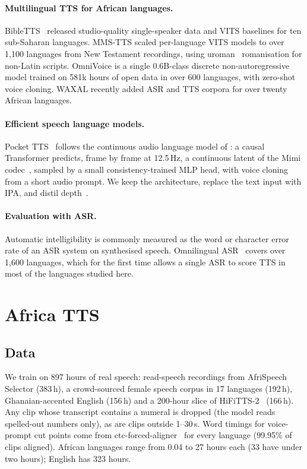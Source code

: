 \documentclass[10pt,twocolumn]{article}
\newcommand{\att}{Africa TTS}
\begin{document}
\paragraph{Multilingual TTS for African languages.} BibleTTS~\cite{meyer2022bibletts} released
studio-quality single-speaker data and VITS baselines for ten sub-Saharan languages. MMS-TTS
\cite{pratap2023mms} scaled per-language VITS models to over 1{,}100 languages from New Testament
recordings, using uroman~\cite{hermjakob2018uroman} romanisation for non-Latin scripts. OmniVoice
\cite{zhu2026omnivoice} is a single 0.6B-class discrete non-autoregressive model trained on
581k hours of open data in over 600 languages, with zero-shot voice cloning. WAXAL
\cite{diack2026waxal} recently added ASR and TTS corpora for over twenty African languages.

\paragraph{Efficient speech language models.} Pocket TTS~\cite{pockettts} follows the
continuous audio language model of \citet{rouard2025calm}: a causal Transformer predicts, frame
by frame at 12.5\,Hz, a continuous latent of the Mimi codec~\cite{defossez2024moshi}, sampled
by a small consistency-trained MLP head, with voice cloning from a short audio prompt. We keep
the architecture, replace the text input with IPA, and distil depth~\cite{hinton2015distilling}.

\paragraph{Evaluation with ASR.} Automatic intelligibility is commonly measured as the word or
character error rate of an ASR system on synthesised speech. Omnilingual ASR~\cite{omniasr2025}
covers over 1{,}600 languages, which for the first time allows a single ASR to score TTS in
most of the languages studied here.

\section{\att{}}

\subsection{Data}
We train on 897 hours of real speech: read-speech recordings from AfriSpeech Selector (383\,h), a
crowd-sourced female speech corpus in 17 languages (192\,h), Ghanaian-accented English
(156\,h) and a 200-hour slice of HiFiTTS-2~\cite{langman2025hifitts2} (166\,h). Any clip whose
transcript contains a numeral is dropped (the model reads spelled-out numbers only), as are
clips outside 1--30\,s. Word timings for voice-prompt cut points come from
ctc-forced-aligner~\cite{ctcforcedaligner} for every language (99.95\% of clips aligned). African languages
range from 0.04 to 27 hours each (33 have under two hours); English has 323 hours.
\end{document}
